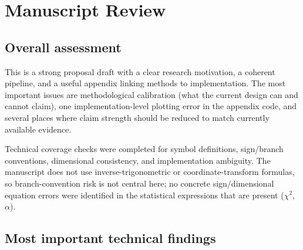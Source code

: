 \documentclass[11pt]{article}
\begin{document}
\section*{Manuscript Review}

\subsection*{Overall assessment}
This is a strong proposal draft with a clear research motivation, a coherent pipeline, and a useful appendix linking methods to implementation. The most important issues are methodological calibration (what the current design can and cannot claim), one implementation-level plotting error in the appendix code, and several places where claim strength should be reduced to match currently available evidence.

Technical coverage checks were completed for symbol definitions, sign/branch conventions, dimensional consistency, and implementation ambiguity. The manuscript does not use inverse-trigonometric or coordinate-transform formulas, so branch-convention risk is not central here; no concrete sign/dimensional equation errors were identified in the statistical expressions that are present (\(\chi^2\), \(\alpha\)).

\subsection*{Most important technical findings}
\end{document}
